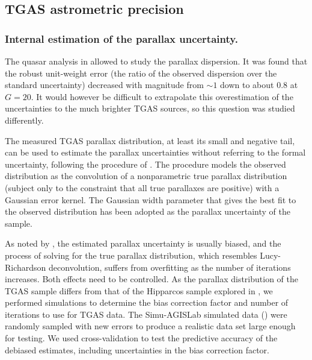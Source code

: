 \subsection{TGAS astrometric precision}\label{sec:precision-plx}

\subsubsection{Internal estimation of the parallax uncertainty.}\label{sec:wp942:parallaxdeconv}

The quasar analysis in   allowed to study the parallax 
dispersion. It was found that the robust unit-weight error (the ratio of the observed
dispersion over the standard uncertainty) decreased with magnitude 
from $\sim 1$ down to about 0.8 at $G=20$. 
It would however be difficult to extrapolate this overestimation of the
uncertainties to the much brighter TGAS sources, so this question was studied differently.

The measured TGAS parallax distribution, at least its small and negative tail, can be used to estimate the parallax uncertainties without referring to the formal uncertainty, following the  procedure of \citet{1995A&A...304...61L}. The procedure models the observed distribution as the convolution of a nonparametric true parallax distribution (subject only to the constraint that all true parallaxes are positive) with a Gaussian error kernel. The Gaussian width parameter that gives the best fit to the observed distribution has been adopted as the parallax uncertainty of the sample.

As noted by \citeauthor{1995A&A...304...61L}, the estimated parallax uncertainty is usually biased, and the process of solving for the true parallax distribution, which resembles Lucy-Richardson deconvolution, suffers from overfitting as the number of iterations increases. Both effects need to be controlled. As the parallax distribution of the TGAS sample differs from that of the Hipparcos sample explored in \citet{1995A&A...304...61L}, we performed simulations to determine the bias correction factor and number of iterations to use for TGAS data. The Simu-AGISLab simulated data () were randomly sampled with new errors to produce a realistic data set large enough for testing. We used cross-validation to test the predictive accuracy of the debiased estimates, including uncertainties in the bias correction factor.

